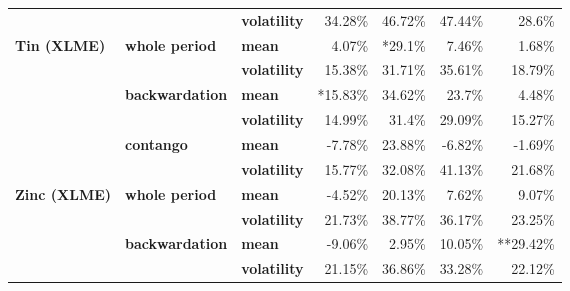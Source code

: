 \documentclass[
  authoryear,
  preprint,
  3p]{elsarticle}
\begin{document}
\begin{longtable}[t]{>{}l>{}l>{}l>{}r>{}r>{}r>{}r}
\textbf{} & \textbf{} & \textbf{volatility} & \textcolor[HTML]{4285f4}{34.28\%} & \textcolor[HTML]{4285f4}{46.72\%} & \textcolor[HTML]{4285f4}{47.44\%} & \textcolor[HTML]{4285f4}{28.6\%}\\
\textbf{Tin (XLME)} & \textbf{whole period} & \textbf{mean} & \textcolor[HTML]{4285f4}{4.07\%} & \textcolor[HTML]{4285f4}{*29.1\%} & \textcolor[HTML]{4285f4}{7.46\%} & \textcolor[HTML]{4285f4}{1.68\%}\\
\textbf{} & \textbf{} & \textbf{volatility} & \textcolor[HTML]{4285f4}{15.38\%} & \textcolor[HTML]{4285f4}{31.71\%} & \textcolor[HTML]{4285f4}{35.61\%} & \textcolor[HTML]{4285f4}{18.79\%}\\
\addlinespace
\textbf{} & \textbf{backwardation} & \textbf{mean} & \textcolor[HTML]{4285f4}{*15.83\%} & \textcolor[HTML]{4285f4}{34.62\%} & \textcolor[HTML]{4285f4}{23.7\%} & \textcolor[HTML]{4285f4}{4.48\%}\\
\textbf{} & \textbf{} & \textbf{volatility} & \textcolor[HTML]{4285f4}{14.99\%} & \textcolor[HTML]{4285f4}{31.4\%} & \textcolor[HTML]{4285f4}{29.09\%} & \textcolor[HTML]{4285f4}{15.27\%}\\
\textbf{} & \textbf{contango} & \textbf{mean} & \textcolor[HTML]{4285f4}{-7.78\%} & \textcolor[HTML]{4285f4}{23.88\%} & \textcolor[HTML]{4285f4}{-6.82\%} & \textcolor[HTML]{4285f4}{-1.69\%}\\
\textbf{} & \textbf{} & \textbf{volatility} & \textcolor[HTML]{4285f4}{15.77\%} & \textcolor[HTML]{4285f4}{32.08\%} & \textcolor[HTML]{4285f4}{41.13\%} & \textcolor[HTML]{4285f4}{21.68\%}\\
\textbf{Zinc (XLME)} & \textbf{whole period} & \textbf{mean} & \textcolor[HTML]{4285f4}{-4.52\%} & \textcolor[HTML]{4285f4}{20.13\%} & \textcolor[HTML]{4285f4}{7.62\%} & \textcolor[HTML]{4285f4}{9.07\%}\\
\addlinespace
\textbf{} & \textbf{} & \textbf{volatility} & \textcolor[HTML]{4285f4}{21.73\%} & \textcolor[HTML]{4285f4}{38.77\%} & \textcolor[HTML]{4285f4}{36.17\%} & \textcolor[HTML]{4285f4}{23.25\%}\\
\textbf{} & \textbf{backwardation} & \textbf{mean} & \textcolor[HTML]{4285f4}{-9.06\%} & \textcolor[HTML]{4285f4}{2.95\%} & \textcolor[HTML]{4285f4}{10.05\%} & \textcolor[HTML]{4285f4}{**29.42\%}\\
\textbf{} & \textbf{} & \textbf{volatility} & \textcolor[HTML]{4285f4}{21.15\%} & \textcolor[HTML]{4285f4}{36.86\%} & \textcolor[HTML]{4285f4}{33.28\%} & \textcolor[HTML]{4285f4}{22.12\%}\\

\end{longtable}
\end{document}
